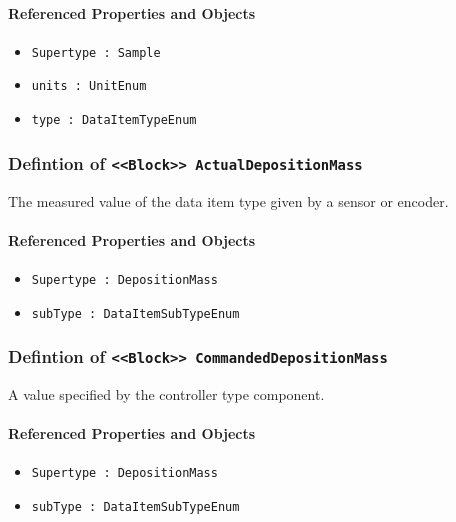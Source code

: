 \FloatBarrier
\paragraph{Referenced Properties and Objects}

\begin{itemize}
\item \texttt{Supertype : Sample}

\item \texttt{units : UnitEnum}

\item \texttt{type : DataItemTypeEnum}

\end{itemize}
\FloatBarrier
\subsubsection{Defintion of \texttt{<<Block>> ActualDepositionMass}}
  \label{type:ActualDepositionMass}

\FloatBarrier

The measured value of the data item type given by a sensor or encoder.

\FloatBarrier
\paragraph{Referenced Properties and Objects}

\begin{itemize}
\item \texttt{Supertype : DepositionMass}

\item \texttt{subType : DataItemSubTypeEnum}

\end{itemize}
\FloatBarrier
\subsubsection{Defintion of \texttt{<<Block>> CommandedDepositionMass}}
  \label{type:CommandedDepositionMass}

\FloatBarrier

A value specified by the controller type component.

\FloatBarrier
\paragraph{Referenced Properties and Objects}

\begin{itemize}
\item \texttt{Supertype : DepositionMass}

\item \texttt{subType : DataItemSubTypeEnum}

\end{itemize}
\FloatBarrier
